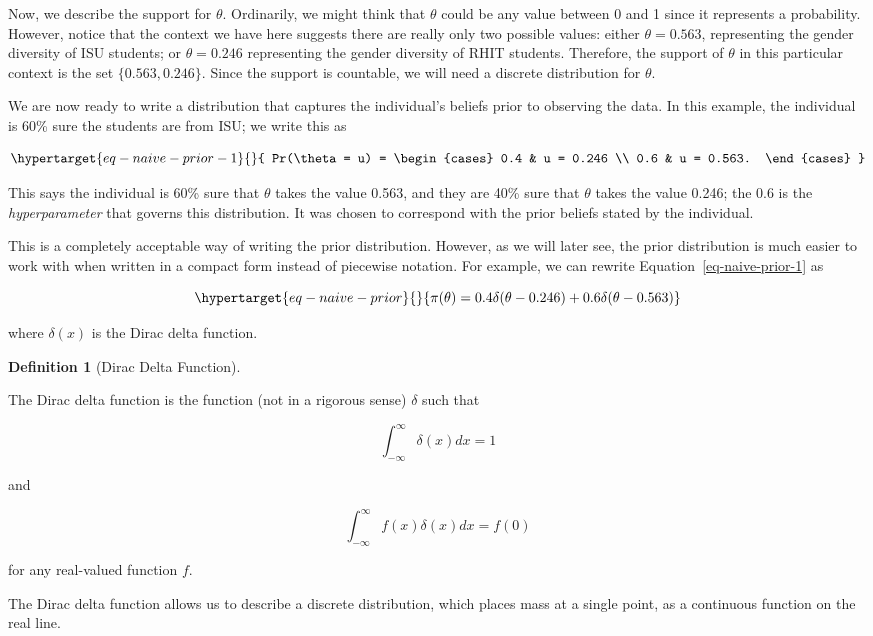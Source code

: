 \documentclass[
  letterpaper,
  DIV=11,
  numbers=noendperiod]{scrreprt}
\theoremstyle{definition}
\newtheorem{definition}{Definition}[chapter]
\theoremstyle{plain}
\theoremstyle{definition}
\theoremstyle{remark}
\begin{document}
Now, we describe the support for \(\theta\). Ordinarily, we might think
that \(\theta\) could be any value between 0 and 1 since it represents a
probability. However, notice that the context we have here suggests
there are really only two possible values: either \(\theta = 0.563\),
representing the gender diversity of ISU students; or \(\theta = 0.246\)
representing the gender diversity of RHIT students. Therefore, the
support of \(\theta\) in this particular context is the set
\(\{0.563, 0.246\}\). Since the support is countable, we will need a
discrete distribution for \(\theta\).

We are now ready to write a distribution that captures the individual's
beliefs prior to observing the data. In this example, the individual is
60\% sure the students are from ISU; we write this as

\begin{equation}\protect\hypertarget{eq-naive-prior-1}{}{
Pr(\theta = u) = \begin{cases}
  0.4 & u = 0.246 \\
  0.6 & u = 0.563. \end{cases}
}\label{eq-naive-prior-1}\end{equation}

This says the individual is 60\% sure that \(\theta\) takes the value
0.563, and they are 40\% sure that \(\theta\) takes the value 0.246; the
0.6 is the \emph{hyperparameter} that governs this distribution. It was
chosen to correspond with the prior beliefs stated by the individual.

This is a completely acceptable way of writing the prior distribution.
However, as we will later see, the prior distribution is much easier to
work with when written in a compact form instead of piecewise notation.
For example, we can rewrite Equation~\ref{eq-naive-prior-1} as

\begin{equation}\protect\hypertarget{eq-naive-prior}{}{\pi(\theta) = 0.4\delta(\theta - 0.246) + 0.6\delta(\theta - 0.563)}\label{eq-naive-prior}\end{equation}

where \(\delta(x)\) is the Dirac delta function.

\begin{definition}[Dirac Delta
Function]\protect\hypertarget{def-dirac-delta}{}\label{def-dirac-delta}

The Dirac delta function is the function (not in a rigorous sense)
\(\delta\) such that

\[\int_{-\infty}^{\infty} \delta(x) dx = 1\]

and

\[\int_{-\infty}^{\infty} f(x) \delta(x) dx = f(0)\]

for any real-valued function \(f\).

The Dirac delta function allows us to describe a discrete distribution,
which places mass at a single point, as a continuous function on the
real line.

\end{definition}
\end{document}
